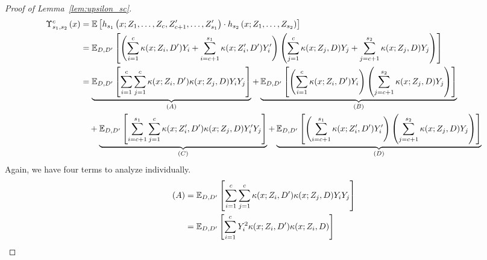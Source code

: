 \begin{proof}[Proof of Lemma~\ref{lem:upsilon_sc}]
	\begin{equation}
		\begin{aligned}
			\Upsilon_{s_1, s_2}^{c}\left(x\right)
			 & = \mathbb{E}\left[h_{s_1}\left(x; Z_1, \ldots, Z_c, Z^{\prime}_{c+1}, \ldots,  Z^{\prime}_{s_1}\right) \cdot
			h_{s_2}\left(x; Z_1, \ldots, Z_{s_2}\right)\right]                                                                                                                       \\
			 & = \mathbb{E}_{D, D^{\prime}}\left[
				\left(\sum_{i = 1}^{c} \kappa(x; Z_{i}, D^{\prime})Y_{i} + \sum_{i = c+1}^{s_1} \kappa(x; Z_{i}^{\prime}, D^{\prime})Y_{i}^{\prime}\right)
				\left(\sum_{j = 1}^{c} \kappa(x; Z_{j}, D)Y_j + \sum_{j = c+1}^{s_2}\kappa(x; Z_{j}, D)Y_j \right)
			\right]                                                                                                                                                                                             \\
			 & = \underbrace{\mathbb{E}_{D, D^{\prime}}\left[\sum_{i = 1}^{c}\sum_{j = 1}^{c} \kappa(x; Z_{i}, D^{\prime})\kappa(x; Z_{j}, D)Y_{i} Y_j\right]}_{(A)}
			+ \underbrace{\mathbb{E}_{D, D^{\prime}}\left[\left(\sum_{i = 1}^{c}\kappa(x; Z_{i}, D^{\prime}) Y_{i}\right) \left(\sum_{j = c+1}^{s_2} \kappa(x; Z_{j}, D) Y_j\right)\right]}_{(B)} \\
			 & \quad + \underbrace{\mathbb{E}_{D, D^{\prime}}\left[\sum_{i = c+1}^{s_1}\sum_{j = 1}^{c} \kappa(x; Z_{i}^{\prime}, D^{\prime})\kappa(x; Z_{j}, D)Y_{i}^{\prime} Y_j\right]}_{(C)}
			+ \underbrace{\mathbb{E}_{D, D^{\prime}}\left[\left(\sum_{i = c+1}^{s_1}\kappa(x; Z_{i}^{\prime}, D^{\prime}) Y_{i}^{\prime}\right)
					\left(\sum_{j = c+1}^{s_2} \kappa(x; Z_{j}, D) Y_j\right)\right]}_{(D)}
		\end{aligned}
	\end{equation}
	Again, we have four terms to analyze individually.
	\begin{equation}
		\begin{aligned}
			(A)
			 & = \E_{D, D^{\prime}}\left[\sum_{i = 1}^{c}\sum_{j = 1}^{c} \kappa(x; Z_{i}, D^{\prime})\kappa(x; Z_{j}, D)Y_{i} Y_j\right]\\
			& = \E_{D, D^{\prime}}\left[\sum_{i = 1}^{c} Y_{i}^2 \kappa(x; Z_{i}, D^{\prime})\kappa(x; Z_{i}, D)\right]                                                                       \\

\end{aligned}
\end{equation}
\end{proof}

